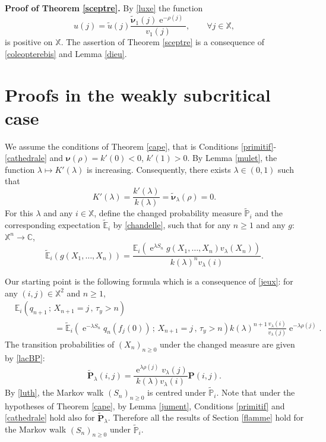 \documentclass[12pt]{amsart}
\theoremstyle{definition}
\numberwithin{equation}{section}
\def\bb#1{\mathbb{#1}}
\def\bs#1{\boldsymbol{#1}}
\def\bf#1{\mathbf{#1}}
\def\tt#1{\tilde{#1}}
\def\tbf#1{\tilde{\mathbf{#1}}}
\def\tbs#1{\tilde{\boldsymbol{#1}}}
\def\tbb#1{\tilde{\mathbb{#1}}}
\def\geq{\geqslant}
\renewcommand\ll{\lambda}
\DeclareMathOperator{\e}{e}
\begin{document}
\textbf{Proof of Theorem \ref{sceptre}.} By \eqref{luxe} the function
\[
u(j) = \tt u(j) \frac{\tbs \nu_1(j) \e^{-\rho(j)}}{ v_1(j)}, \qquad \forall j \in \bb X,
\]
is positive on $\bb X$. The assertion of Theorem \ref{sceptre} is a consequence of \eqref{coleopterebis} and Lemma \ref{dieu}.



\section{Proofs in the weakly subcritical case}
\label{weaklysubcrit}



We assume the conditions of Theorem \ref{cape}, that is
 Conditions \ref{primitif}-\ref{cathedrale} and 
 $\bs \nu(\rho)=k'(0)<0$, $k'(1)>0$.
By Lemma \ref{mulet}, the function $\ll \mapsto K'(\ll)$ is increasing. Consequently, there exists $\ll \in (0,1)$ such that
\begin{equation}
\label{luth}
K'(\ll) = \frac{k'(\ll)}{k(\ll)} = \tbs \nu_{\ll} (\rho) = 0.
\end{equation}
For this $\ll$ and any $i \in \bb X$, define the changed probability measure $\tbb P_i$ and the corresponding 
expectation $\tbb E_i$ by \eqref{chandelle}, such that for any $n \geq 1$ and any $g$: $\bb X^n \to \bb C$,
\begin{equation}
\label{samovar}
\tbb E_i \left( g(X_1, \dots, X_n) \right) = \frac{\bb E_i \left( \e^{\ll S_n} g(X_1, \dots, X_n) v_{\ll}(X_n) \right)}{k(\ll)^n v_{\ll}(i)}.
\end{equation}

Our starting point is the following formula which is a consequence of \eqref{jeux}: for any $(i,j) \in \bb X^2$ and $n \geq 1$,
\begin{align}
&\bb E_i \left( q_{n+1} \,;\, X_{n+1} = j \,,\, \tau_y > n \right) \nonumber\\
&\hspace{2cm}= \tbb E_i \left( \e^{-\ll S_n} q_n\left( f_j(0) \right) \,;\, X_{n+1} = j \,,\, \tau_y > n \right) k(\ll)^{n+1} \frac{v_{\ll}(i)}{v_{\ll}(j)} \e^{-\ll \rho(j)}.
\label{falaise}
\end{align}
The transition probabilities of $\left( X_n \right)_{n\geq 0}$ under the changed measure are given by \eqref{lacBP}:
\[
\tbf P_{\ll} (i,j) = \frac{\e^{\ll \rho(j)} v_{\ll}(j)}{k(\ll)v_{\ll}(i)} \bf P(i,j).
\]
By \eqref{luth}, the Markov walk $(S_n)_{n\geq 0}$ is centred under $\tbb P_i$. Note that under the hypotheses of Theorem \ref{cape}, by Lemma \ref{jument}, Conditions \ref{primitif} and \ref{cathedrale} hold also for $\tbf P_{\ll}$. Therefore all the results of Section \ref{flamme} hold for the Markov walk $\left( S_n \right)_{n\geq 0}$ under $\tbb P_i$.
\end{document}
